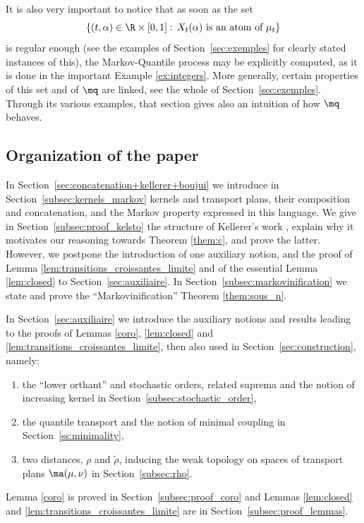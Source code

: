 \begin{rem}
It is also very important to notice that as soon as the set
\[
\{(t,\alpha)\in\R\times[0,1]:\,X_t(\alpha)\text{ is an atom of }\mu_t\}
\]
is regular enough (see the examples of Section~\ref{sec:exemples} for clearly stated instances of this), the Markov-Quantile process may be explicitly computed, as it is done in the important Example \ref{ex:integers}. More generally, certain properties of this set and of $\mq$ are linked, see the whole of Section~\ref{sec:exemples}. Through its various examples, that section gives also an intuition of how $\mq$ behaves.
\end{rem}

\subsection{Organization of the paper}\label{subsec:organisation}
In Section~\ref{sec:concatenation+kellerer+boujui} we introduce in Section~\ref{subsec:kernels_markov} kernels and transport plans, their composition and concatenation, and the Markov property expressed in this language. We give in Section~\ref{subsec:proof_kelsto} the structure of Kellerer's work \cite{Ke72,Ke73}, explain why it motivates our reasoning towards Theorem \ref{them:c}, and prove the latter. However, we postpone the introduction of one auxiliary notion, and the proof of Lemma \ref{lem:transitions_croissantes_limite} and of the essential Lemma \ref{lem:closed} to Section~\ref{sec:auxiliaire}. In Section~\ref{subsec:markovinification} we state and prove the ``Markovinification'' Theorem \ref{them:sous_n}.

In Section~\ref{sec:auxiliaire} we introduce the auxiliary notions and results leading to the proofs of Lemmas \ref{coro}, \ref{lem:closed} and \ref{lem:transitions_croissantes_limite}, then also used in Section~\ref{sec:construction}, namely:
\begin{enumerate}
\item the ``lower orthant'' and stochastic orders, related suprema and the notion of increasing kernel in Section~\ref{subsec:stochastic_order},
\item the quantile transport and the notion of minimal coupling in Section~\ref{ss:minimality},
\item two distances, $\rho$ and $\tilde \rho$, inducing the weak topology on spaces of transport plans $\ma(\mu,\nu)$ in Section~\ref{subsec:rho}.
\end{enumerate}
Lemma \ref{coro} is proved in Section~\ref{subsec:proof_coro} and Lemmas \ref{lem:closed} and \ref{lem:transitions_croissantes_limite} are in Section~\ref{subsec:proof_lemmas}.

